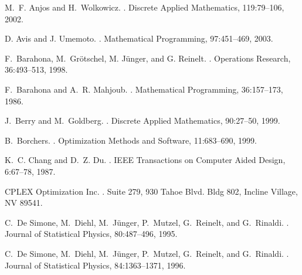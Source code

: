 \documentclass[12pt]{article}
\begin{document}
\begin{thebibliography}{10}

M.~F. Anjos and H.~Wolkowicz.
.
\newblock Discrete Applied Mathematics, 119:79--106, 2002.

D. Avis and J. Umemoto.
.
\newblock Mathematical Programming, 97:451--469, 2003.

F.~Barahona, M.~Gr\"{o}tschel, M. J\"{u}nger, and G. Reinelt.
.
\newblock Operations Research, 36:493--513, 1998.

F.~Barahona and A.~R. Mahjoub.
.
\newblock Mathematical Programming, 36:157--173, 1986.

J.~Berry and M.~Goldberg.
.
\newblock Discrete Applied Mathematics, 90:27--50, 1999.

B.~Borchers.
.
\newblock Optimization Methods and Software, 11:683--690, 1999.

K.~C. Chang and D.~Z. Du.
.
\newblock IEEE Transactions on Computer Aided Design, 6:67--78,
1987.

{CPLEX Optimization Inc}.
.
\newblock Suite 279, 930 Tahoe Blvd. Bldg 802, Incline Village, NV 89541.

C.~{De Simone}, M.~Diehl, M.~J\"{u}nger, P.~Mutzel, G.~Reinelt,
and G.~Rinaldi.
.
\newblock Journal of Statistical Physics, 80:487--496, 1995.

C.~{De Simone}, M.~Diehl, M.~J\"{u}nger, P.~Mutzel, G.~Reinelt,
and G.~Rinaldi.
.
\newblock Journal of Statistical Physics, 84:1363--1371, 1996.

%


\end{thebibliography}
\end{document}
